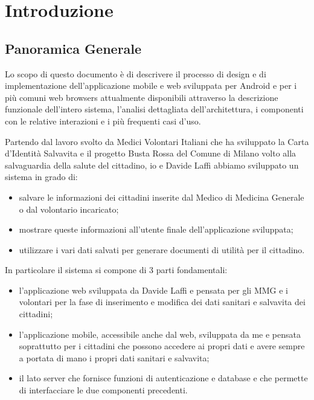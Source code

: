 \documentclass[12pt,a4paper,twoside,openright,titlepage]{book}
\begin{document}
\chapter{Introduzione}
%
\label{cap:introduzione}
\section{Panoramica Generale}
Lo scopo di questo documento è di descrivere il processo di design e di implementazione dell'applicazione mobile e web sviluppata per Android e per i più comuni web browsers attualmente disponibili attraverso la descrizione funzionale dell'intero sistema, l'analisi dettagliata dell'architettura, i componenti con le relative interazioni e i più frequenti casi d'uso.\newline

Partendo dal lavoro svolto da Medici Volontari Italiani che ha sviluppato la Carta d'Identità Salvavita e il progetto Busta Rossa del Comune di Milano volto alla salvaguardia della salute del cittadino, io e Davide Laffi abbiamo sviluppato un sistema in grado di:
\begin{itemize}
\item salvare le informazioni dei cittadini inserite dal Medico di Medicina Generale o dal volontario incaricato;
\item mostrare queste informazioni all'utente finale dell'applicazione sviluppata;
\item utilizzare i vari dati salvati per generare documenti di utilità per il cittadino.
\end{itemize}
In particolare il sistema si compone di 3 parti fondamentali:
\begin{itemize}
\item l'applicazione web sviluppata da Davide Laffi e pensata per gli MMG e i volontari per la fase di inserimento e modifica dei dati sanitari e salvavita dei cittadini;
\item l'applicazione mobile, accessibile anche dal web, sviluppata da me e pensata soprattutto per i cittadini che possono accedere ai propri dati e avere sempre a portata di mano i propri dati sanitari e salvavita;
\item il lato server che fornisce funzioni di autenticazione e database e che permette di interfacciare le due componenti precedenti.
\end{itemize}
\end{document}
